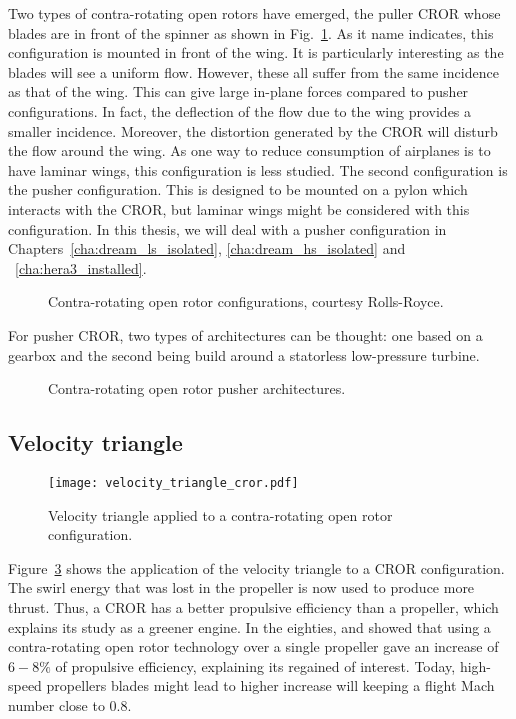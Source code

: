 Two types of contra-rotating open rotors have emerged, the
puller CROR whose blades are in front of the spinner as 
shown in Fig.~\ref{fig:cror_configurations}. As it
name indicates, this configuration is mounted in front of the
wing. It is particularly interesting as the blades will see
a uniform flow. However, these all suffer from the same incidence as that
of the wing. This can give large in-plane forces compared to pusher
configurations. In fact, the deflection of the flow due to the wing provides
a smaller incidence.
Moreover, the distortion generated
by the CROR will disturb the flow around the wing. As one way to reduce
consumption of airplanes is to have laminar wings, this configuration
is less studied. The second configuration is the pusher
configuration. This is designed to be mounted on a pylon which
interacts with the CROR, but laminar wings might be considered with
this configuration. In this thesis, we will deal with a pusher configuration
in Chapters~\ref{cha:dream_ls_isolated}, 
\ref{cha:dream_hs_isolated} and ~\ref{cha:hera3_installed}.
\begin{figure}[htb]
  \centering
  \caption{Contra-rotating open rotor configurations, courtesy Rolls-Royce.}
  \label{fig:cror_configurations}
\end{figure}

For pusher CROR, two types of architectures can be thought:
one based on a gearbox and the second
being build around a statorless low-pressure turbine.
\begin{figure}[htb]
  \centering
  \caption{Contra-rotating open rotor pusher architectures.}
  \label{fig:cror_architectures}
\end{figure}

\subsection{Velocity triangle}
\label{sub:cror_velocity_triangle}
\begin{figure}[htbp]
  \centering
  \texttt{[image: velocity\_triangle\_cror.pdf]}
  \caption{Velocity triangle applied to a contra-rotating open rotor configuration.}
  \label{fig:velocity_triangle_cror}
\end{figure}
Figure~\ref{fig:velocity_triangle_cror} shows the application
of the velocity triangle to a CROR configuration. The swirl
energy that was lost in the propeller is now used to 
produce more thrust. Thus, a CROR has a better propulsive
efficiency than a propeller, which explains its study as
a greener engine. In the eighties, 
\citet{Strack1981} and \citet{Hager1988} showed that
using a contra-rotating open rotor technology over
a single propeller gave an increase of $6-8\%$
of propulsive efficiency, explaining its regained of interest.
Today, high-speed propellers blades might lead to higher increase
will keeping a flight Mach number close to $0.8$.


